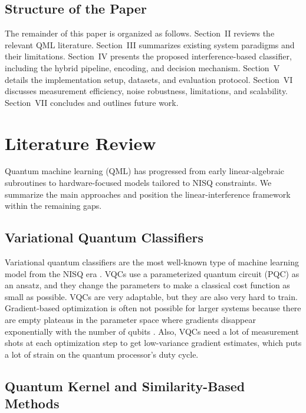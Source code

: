 \documentclass[conference]{IEEEtran}
\begin{document}
\subsection{Structure of the Paper}
The remainder of this paper is organized as follows. Section~II reviews the relevant QML literature. Section~III summarizes existing system paradigms and their limitations. Section~IV presents the proposed interference-based classifier, including the hybrid pipeline, encoding, and decision mechanism. Section~V details the implementation setup, datasets, and evaluation protocol. Section~VI discusses measurement efficiency, noise robustness, limitations, and scalability. Section~VII concludes and outlines future work.

\section{Literature Review}

Quantum machine learning (QML) has progressed from early linear-algebraic subroutines to hardware-focused models tailored to NISQ constraints. We summarize the main approaches and position the linear-interference framework within the remaining gaps.

\subsection{Variational Quantum Classifiers}

Variational quantum classifiers are the most well-known type of machine learning model from the NISQ era \cite{benedetti2019parameterized,abbas2021power}. VQCs use a parameterized quantum circuit (PQC) as an ansatz, and they change the parameters to make a classical cost function as small as possible. VQCs are very adaptable, but they are also very hard to train. Gradient-based optimization is often not possible for larger systems because there are empty plateaus in the parameter space where gradients disappear exponentially with the number of qubits \cite{mcclean2018barren}. Also, VQCs need a lot of measurement shots at each optimization step to get low-variance gradient estimates, which puts a lot of strain on the quantum processor's duty cycle.

\subsection{Quantum Kernel and Similarity-Based Methods}
\end{document}
